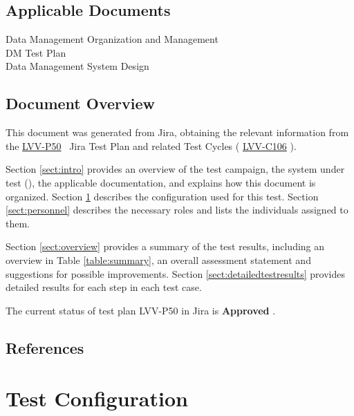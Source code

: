 \documentclass[DM,lsstdraft,STR,toc]{lsstdoc}
\begin{document}
\subsection{Applicable Documents}\label{applicable-documents}

 Data Management Organization and Management\\
 DM Test Plan\\
 Data Management System Design\\[2\baselineskip]


\subsection{Document Overview}
\label{sect:docoverview}

This document was generated from Jira, obtaining the relevant information from the 
\href{https://jira.lsstcorp.org/secure/Tests.jspa#/testPlan/LVV-P50}{LVV-P50}
~Jira Test Plan and related Test Cycles (
  \href{https://jira.lsstcorp.org/secure/Tests.jspa#/testCycle/LVV-C106}{LVV-C106}
).

Section \ref{sect:intro} provides an overview of the test campaign, the system under test (\product{}), the applicable documentation, and explains how this document is organized.
Section \ref{sect:configuration}  describes the configuration used for this test.
Section \ref{sect:personnel} describes the necessary roles and lists the individuals assigned to them.

Section \ref{sect:overview} provides a summary of the test results, including an overview in Table \ref{table:summary}, an overall assessment statement and suggestions for possible improvements.
Section \ref{sect:detailedtestresults} provides detailed results for each step in each test case.

The current status of test plan LVV-P50 in Jira is \textbf{ Approved }.

\subsection{References}
\label{sect:references}
\renewcommand{\refname}{}

\section{Test Configuration}
\label{sect:configuration}
\end{document}
